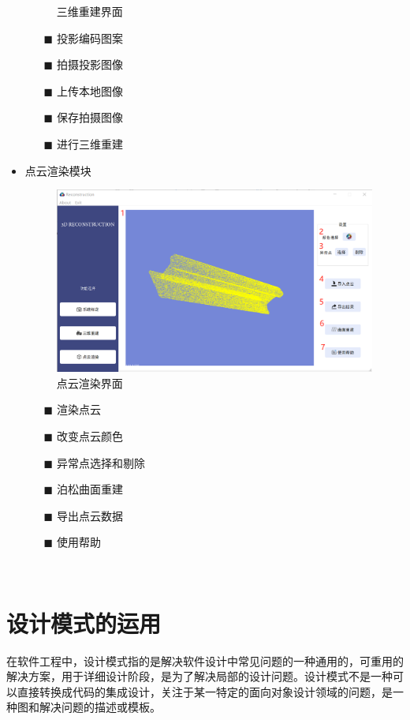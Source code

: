 \documentclass[article]{BJTU-thesis}
\begin{document}
\begin{itemize}
\begin{figure}[!htbp]
     	\caption{三维重建界面}
     	\label{fig:fig1}
     \end{figure}
 \begin{itemize}
 	\item[$\blacksquare$] 投影编码图案
 	\item[$\blacksquare$] 拍摄投影图像
 	\item[$\blacksquare$] 上传本地图像
 	\item[$\blacksquare$] 保存拍摄图像
 	\item[$\blacksquare$] 进行三维重建
 	
 \end{itemize}
 \item 点云渲染模块
 \begin{figure}[!htbp]
 	\centering
 	\includegraphics[scale=0.6]{4.png}
 	\caption{点云渲染界面}
 \end{figure}

\begin{itemize}
	\item[$\blacksquare$] 渲染点云
	\item[$\blacksquare$] 改变点云颜色
	\item[$\blacksquare$] 异常点选择和剔除
	\item[$\blacksquare$] 泊松曲面重建
	\item[$\blacksquare$] 导出点云数据
	\item[$\blacksquare$] 使用帮助
	
\end{itemize}
     \end{itemize}
		
\section{设计模式的运用}
在软件工程中，设计模式指的是解决软件设计中常见问题的一种通用的，可重用的解决方案，用于详细设计阶段，是为了解决局部的设计问题。设计模式不是一种可以直接转换成代码的集成设计，关注于某一特定的面向对象设计领域的问题，是一种图和解决问题的描述或模板。
\end{document}

